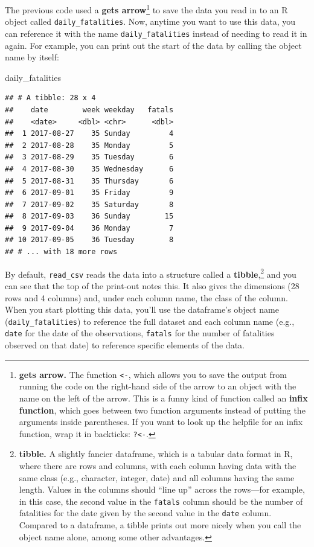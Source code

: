 \documentclass[]{tufte-book}
\newenvironment{Shaded}{}{}
\newcommand{\NormalTok}[1]{#1}
\begin{document}
The previous code used a \textbf{gets arrow}\footnote{\textbf{gets arrow.} The function
  \texttt{\textless{}-}, which allows you to save the output from running the code on the right-hand
  side of the arrow to an object with the name on the left of the arrow. This is a
  funny kind of function called an \textbf{infix function}, which goes between two
  function arguments instead of putting the arguments inside parentheses. If you
  want to look up the helpfile for an infix function, wrap it in backticks:
  \texttt{?\textasciigrave{}\textless{}-\textasciigrave{}}.} to save the data you read in to an R object called \texttt{daily\_fatalities}.
Now, anytime you want to use this data, you can reference it with the name
\texttt{daily\_fatalities} instead of needing to read it in again. For example, you
can print out the start of the data by calling the object name by itself:

\begin{Shaded}
\begin{Highlighting}[]
\NormalTok{daily_fatalities}
\end{Highlighting}
\end{Shaded}

\begin{verbatim}
## # A tibble: 28 x 4
##    date        week weekday   fatals
##    <date>     <dbl> <chr>      <dbl>
##  1 2017-08-27    35 Sunday         4
##  2 2017-08-28    35 Monday         5
##  3 2017-08-29    35 Tuesday        6
##  4 2017-08-30    35 Wednesday      6
##  5 2017-08-31    35 Thursday       6
##  6 2017-09-01    35 Friday         9
##  7 2017-09-02    35 Saturday       8
##  8 2017-09-03    36 Sunday        15
##  9 2017-09-04    36 Monday         7
## 10 2017-09-05    36 Tuesday        8
## # ... with 18 more rows
\end{verbatim}

By default, \texttt{read\_csv} reads the data into a structure called a \textbf{tibble},\footnote{\textbf{tibble.}
  A slightly fancier dataframe, which is a tabular data format in R, where there are
  rows and columns, with each column having data with the same class (e.g., character,
  integer, date) and all columns having the same length. Values in the columns should
  ``line up'' across the rows---for example, in this case, the second value in the
  \texttt{fatals} column should be the number of fatalities for the date given by the second
  value in the \texttt{date} column. Compared to a dataframe, a tibble prints out more nicely
  when you call the object name alone, among some other advantages.} and you
can see that the top of the print-out notes this. It also gives the dimensions
(28 rows and 4 columns) and, under each column name, the class of the column.
When you start plotting this data, you'll use the dataframe's object name
(\texttt{daily\_fatalities}) to reference the full dataset and each column name
(e.g., \texttt{date} for the date of the observations, \texttt{fatals} for the number of
fatalities observed on that date) to reference specific elements of the data.
\end{document}
